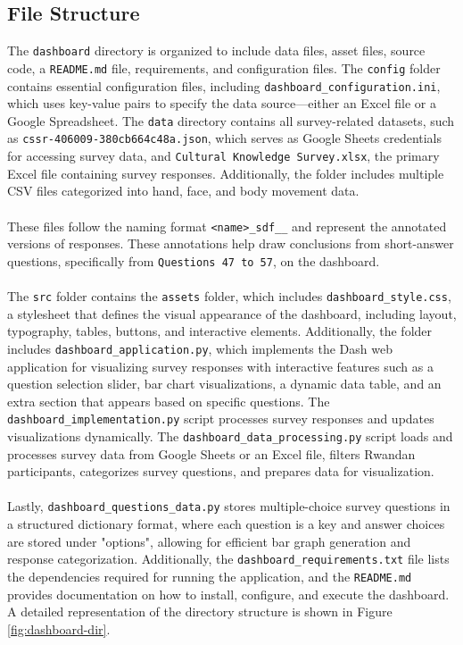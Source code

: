 \documentclass{CSSRforAfrica}
\begin{document}
\subsection*{File Structure}
The \texttt{dashboard} directory is organized to include data files, asset files, source code, a \texttt{README.md} file, requirements, and configuration files. The \texttt{config} folder contains essential configuration files, including \texttt{dashboard\_configuration.ini}, which uses key-value pairs to specify the data source—either an Excel file or a Google Spreadsheet. The \texttt{data} directory contains all survey-related datasets, such as \texttt{cssr-406009-380cb664c48a.json}, which serves as Google Sheets credentials for accessing survey data, and \texttt{Cultural Knowledge Survey.xlsx}, the primary Excel file containing survey responses. Additionally, the folder includes multiple CSV files categorized into hand, face, and body movement data. 
\\~\\
These files follow the naming format \texttt{<name>\_sdf\_<body|hand|face>\_<question number>} and represent the annotated versions of responses. These annotations help draw conclusions from short-answer questions, specifically from \texttt{Questions 47 to 57}, on the dashboard. 
\\~\\
The \texttt{src} folder contains the \texttt{assets} folder, which includes \texttt{dashboard\_style.css}, a stylesheet that defines the visual appearance of the dashboard, including layout, typography, tables, buttons, and interactive elements. Additionally, the folder includes \texttt{dashboard\_application.py}, which implements the Dash web application for visualizing survey responses with interactive features such as a question selection slider, bar chart visualizations, a dynamic data table, and an extra section that appears based on specific questions. The \texttt{dashboard\_implementation.py} script processes survey responses and updates visualizations dynamically. The \texttt{dashboard\_data\_processing.py} script loads and processes survey data from Google Sheets or an Excel file, filters Rwandan participants, categorizes survey questions, and prepares data for visualization. 
\\~\\
Lastly, \texttt{dashboard\_questions\_data.py} stores multiple-choice survey questions in a structured dictionary format, where each question is a key and answer choices are stored under "options", allowing for efficient bar graph generation and response categorization. Additionally, the \texttt{dashboard\_requirements.txt} file lists the dependencies required for running the application, and the \texttt{README.md} provides documentation on how to install, configure, and execute the dashboard. A detailed representation of the directory structure is shown in Figure \ref{fig:dashboard-dir}.
\end{document}

